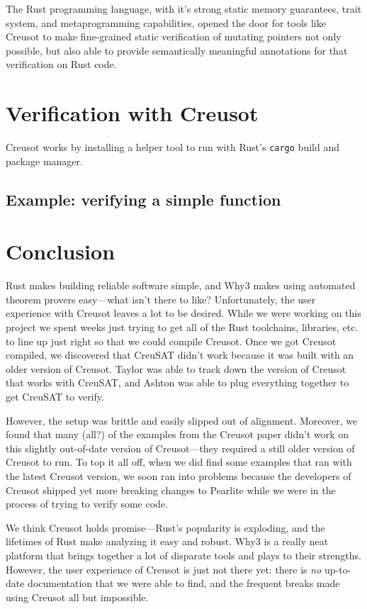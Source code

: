 \documentclass[12pt]{article}
\begin{document}
The Rust programming language, with it's strong static memory guarantees, trait system, and metaprogramming capabilities, 
opened the door for tools like Creusot to make fine-grained static verification of mutating pointers not only possible, but also able to provide 
semantically meaningful annotations for that verification on Rust code.   

\section{Verification with Creusot}

Creusot works by installing a helper tool to run with Rust's \texttt{cargo} build and package manager.

\subsection{Example: verifying a simple function}

\section{Conclusion}

Rust makes building reliable software simple, and Why3 makes using automated theorem provers easy---what isn't there to like?
Unfortunately, the user experience with Creusot leaves a lot to be desired.
While we were working on this project we spent weeks just trying to get all of the Rust toolchains, libraries, etc. to line up just right so that we could compile Creusot.
Once we got Creusot compiled, we discovered that CreuSAT didn't work because it was built with an older version of Creusot.
Taylor was able to track down the version of Creusot that works with CreuSAT, and Ashton was able to plug everything together to get CreuSAT to verify.

However, the setup was brittle and easily slipped out of alignment.
Moreover, we found that many (all?) of the examples from the Creusot paper didn't work on this slightly out-of-date version of Creusot---they required a still older version of Creusot to run.
To top it all off, when we did find some examples that ran with the latest Creusot version, we soon ran into problems because the developers of Creusot shipped yet more breaking changes to Pearlite while we were in the process of trying to verify some code.

We think Creusot holds promise---Rust's popularity is exploding, and the lifetimes of Rust make analyzing it easy and robust.
Why3 is a really neat platform that brings together a lot of disparate tools and plays to their strengths.
However, the user experience of Creusot is just not there yet: there is \emph{no} up-to-date documentation that we were able to find, and the frequent breaks made using Creusot all but impossible.
\end{document}
